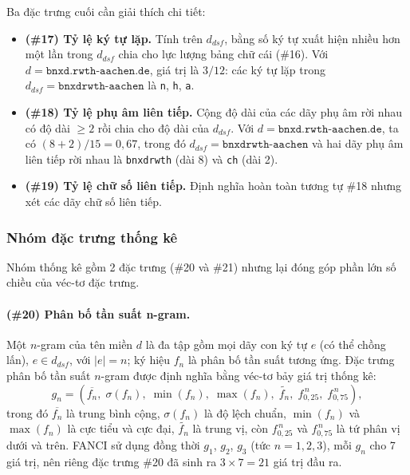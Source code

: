 Ba đặc trưng cuối cần giải thích chi tiết:

\begin{itemize}
  \item \textbf{(\#17) Tỷ lệ ký tự lặp.} Tính trên $d_{dsf}$, bằng số ký tự xuất hiện nhiều hơn một lần trong $d_{dsf}$ chia cho lực lượng bảng chữ cái (\#16). Với $d = \texttt{bnxd.rwth-aachen.de}$, giá trị là $3/12$: các ký tự lặp trong $d_{dsf} = \texttt{bnxdrwth-aachen}$ là \texttt{n}, \texttt{h}, \texttt{a}.
  \item \textbf{(\#18) Tỷ lệ phụ âm liên tiếp.} Cộng độ dài của các dãy phụ âm rời nhau có độ dài $\geq 2$ rồi chia cho độ dài của $d_{dsf}$. Với $d = \texttt{bnxd.rwth-aachen.de}$, ta có $(8+2)/15 = 0{,}67$, trong đó $d_{dsf} = \texttt{bnxdrwth-aachen}$ và hai dãy phụ âm liên tiếp rời nhau là \texttt{bnxdrwth} (dài 8) và \texttt{ch} (dài 2).
  \item \textbf{(\#19) Tỷ lệ chữ số liên tiếp.} Định nghĩa hoàn toàn tương tự \#18 nhưng xét các dãy chữ số liên tiếp.
\end{itemize}

\subsubsection{Nhóm đặc trưng thống kê}

Nhóm thống kê gồm 2 đặc trưng (\#20 và \#21) nhưng lại đóng góp phần lớn số chiều của véc-tơ đặc trưng.

\paragraph{(\#20) Phân bố tần suất n-gram.} Một $n$-gram của tên miền $d$ là đa tập gồm mọi dãy con ký tự $e$ (có thể chồng lấn), $e \in d_{dsf}$, với $|e| = n$; ký hiệu $f_n$ là phân bố tần suất tương ứng. Đặc trưng phân bố tần suất $n$-gram được định nghĩa bằng véc-tơ bảy giá trị thống kê:
\begin{equation}
g_n = \left(\overline{f_n},\; \sigma(f_n),\; \min(f_n),\; \max(f_n),\; \widetilde{f_n},\; f^{\,n}_{0{,}25},\; f^{\,n}_{0{,}75}\right),
\end{equation}
trong đó $\overline{f_n}$ là trung bình cộng, $\sigma(f_n)$ là độ lệch chuẩn, $\min(f_n)$ và $\max(f_n)$ là cực tiểu và cực đại, $\widetilde{f_n}$ là trung vị, còn $f^{\,n}_{0{,}25}$ và $f^{\,n}_{0{,}75}$ là tứ phân vị dưới và trên. FANCI sử dụng đồng thời $g_1$, $g_2$, $g_3$ (tức $n = 1, 2, 3$), mỗi $g_n$ cho 7 giá trị, nên riêng đặc trưng \#20 đã sinh ra $3 \times 7 = 21$ giá trị đầu ra.

